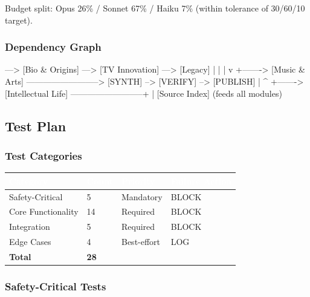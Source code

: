 \documentclass[11pt,letterpaper]{article}
\newcommand{\tableheader}[1]{\textbf{\sffamily\textcolor{white}{#1}}}
\begin{document}
Budget split: Opus 26\% / Sonnet 67\% / Haiku 7\% (within tolerance of 30/60/10 target).

\subsubsection{Dependency Graph}

\begin{asciibox}
  [Schema] ---> [Bio & Origins] ---> [TV Innovation] ---> [Legacy]
      |                                                       |
      |                                                       v
      +-------> [Music & Arts] --------------------------> [SYNTH] --> [VERIFY] --> [PUBLISH]
      |                                                       ^
      +-------> [Intellectual Life] --------------------------+
      |
  [Source Index] (feeds all modules)
\end{asciibox}

\subsection{Test Plan}

\subsubsection{Test Categories}

\begin{center}
\begin{tabularx}{\textwidth}{L{3cm}C{1.5cm}C{1.5cm}C{2.5cm}}
\toprule
{}
\tableheader{Category} & \tableheader{Count} & \tableheader{Priority} & \tableheader{Failure Action} \\
\midrule
Safety-Critical & 5 & Mandatory & BLOCK \\
Core Functionality & 14 & Required & BLOCK \\
Integration & 5 & Required & BLOCK \\
Edge Cases & 4 & Best-effort & LOG \\
\midrule
\textbf{Total} & \textbf{28} & & \\
\bottomrule
\end{tabularx}
\end{center}

\subsubsection{Safety-Critical Tests}
\end{document}
